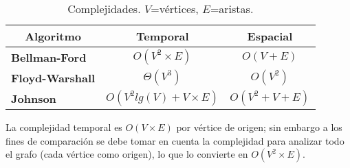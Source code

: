 \documentclass[../tp2_grupo404.tex]{subfiles}
\begin{document}
\begin{table}[H]
    \centering
    \begin{tabular}{@{}lcc@{}}
    \toprule
    \multicolumn{1}{c}{\textbf{Algoritmo}}                 & \textbf{Temporal}          & \textbf{Espacial} \\ \midrule
    {\textbf{Bellman-Ford}}  & $O(V^2\times E)$           & $O(V+E)$     \\
    {\textbf{Floyd-Warshall}}  & $\Theta(V^3)$              & $O(V^2)$          \\
    {\textbf{Johnson}}       & $O(V^2 lg(V) + V\times E)$ & $O(V^2+V+E)$      \\ \bottomrule
    \end{tabular}
    \caption{\label{tabComplejidades}Complejidades. $V$=vértices, $E$=aristas.}
\end{table}

La complejidad temporal es $O(V\times E)$ por vértice de origen;
sin embargo a los fines de comparación se debe tomar en cuenta
la complejidad para analizar todo el grafo (cada vértice como origen),
lo que lo convierte en $O(V^2\times E)$.

\end{document}
